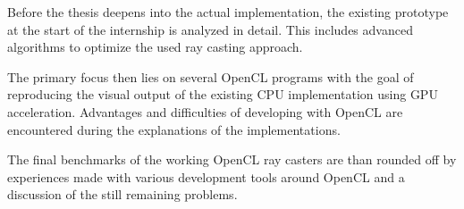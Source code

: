 Before the thesis deepens into the actual implementation, the existing prototype at the start of the internship is analyzed in detail. This includes advanced algorithms to optimize the used ray casting approach.

The primary focus then lies on several OpenCL programs with the goal of reproducing the visual output of the existing CPU implementation using GPU acceleration. Advantages and difficulties of developing with OpenCL are encountered during the explanations of the implementations.

The final benchmarks of the working OpenCL ray casters are than rounded off by experiences made with various development tools around OpenCL and a discussion of the still remaining problems.
